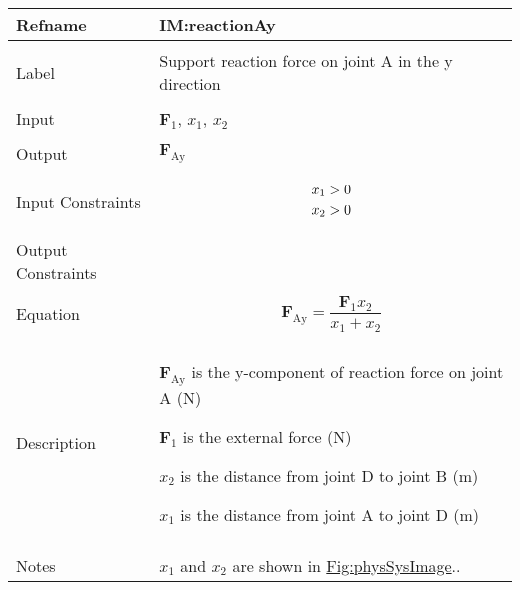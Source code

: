 \documentclass[12pt]{article}
\newcommand{\gt}{\ensuremath >}
\begin{document}
\vspace{\baselineskip}
\noindent
\begin{minipage}{\textwidth}
\begin{tabular}{>{\raggedright}p{}>{\raggedright\arraybackslash}p{}}
\toprule \textbf{Refname} & \textbf{IM:reactionAy}
\label{IM:reactionAy}
\\ \midrule \\
Label & Support reaction force on joint A in the y direction
        
\\ \midrule \\
Input & ${\mathbf{F}_{1}}$, ${x_{\text{1}}}$, ${x_{\text{2}}}$
        
\\ \midrule \\
Output & ${\mathbf{F}_{\text{Ay}}}$
         
\\ \midrule \\
Input Constraints & \begin{displaymath}
                    {x_{\text{1}}}\gt{}0
                    \end{displaymath}
                    \begin{displaymath}
                    {x_{\text{2}}}\gt{}0
                    \end{displaymath}
\\ \midrule \\
Output Constraints & 
\\ \midrule \\
Equation & \begin{displaymath}
           {\mathbf{F}_{\text{Ay}}}=\frac{{\mathbf{F}_{1}} {x_{\text{2}}}}{{x_{\text{1}}}+{x_{\text{2}}}}
           \end{displaymath}
\\ \midrule \\
Description & \begin{symbDescription}
              \item{${\mathbf{F}_{\text{Ay}}}$ is the y-component of reaction force on joint A (${\text{N}}$)}
              \item{${\mathbf{F}_{1}}$ is the external force (${\text{N}}$)}
              \item{${x_{\text{2}}}$ is the distance from joint D to joint B (${\text{m}}$)}
              \item{${x_{\text{1}}}$ is the distance from joint A to joint D (${\text{m}}$)}
              \end{symbDescription}
\\ \midrule \\
Notes & ${x_{\text{1}}}$ and ${x_{\text{2}}}$ are shown in \hyperref[Figure:physSysImage]{Fig:physSysImage}..
        

\end{tabular}
\end{minipage}
\end{document}

